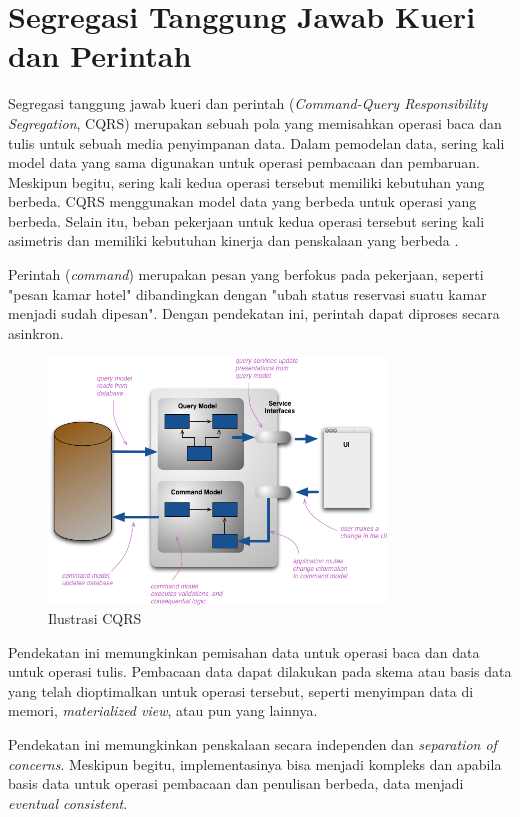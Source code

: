 \section{Segregasi Tanggung Jawab Kueri dan Perintah}

Segregasi tanggung jawab kueri dan perintah (\textit{Command-Query Responsibility Segregation}, CQRS) merupakan sebuah pola yang memisahkan operasi baca dan tulis untuk sebuah media penyimpanan data. Dalam pemodelan data, sering kali model data yang sama digunakan untuk operasi pembacaan dan pembaruan. Meskipun begitu, sering kali kedua operasi tersebut memiliki kebutuhan yang berbeda. CQRS menggunakan model data yang berbeda untuk operasi yang berbeda. Selain itu, beban pekerjaan untuk kedua operasi tersebut sering kali asimetris dan memiliki kebutuhan kinerja dan penskalaan yang berbeda \parencite{msCQRS}.

Perintah (\textit{command}) merupakan pesan yang berfokus pada pekerjaan, seperti "pesan kamar hotel" dibandingkan dengan "ubah status reservasi suatu kamar menjadi sudah dipesan". Dengan pendekatan ini, perintah dapat diproses secara asinkron.

\begin{figure}[htbp]
    \centering
    \includegraphics[width=0.8\textwidth]{resources/chapter-2/cqrs.png}
    \caption{Ilustrasi CQRS \parencite{fwCQRS}}
    \label{fig:cqrs-illustration}
\end{figure}

Pendekatan ini memungkinkan pemisahan data untuk operasi baca dan data untuk operasi tulis. Pembacaan data dapat dilakukan pada skema atau basis data yang telah dioptimalkan untuk operasi tersebut, seperti menyimpan data di memori, \textit{materialized view}, atau pun yang lainnya.

Pendekatan ini memungkinkan penskalaan secara independen dan \textit{separation of concerns}. Meskipun begitu, implementasinya bisa menjadi kompleks dan apabila basis data untuk operasi pembacaan dan penulisan berbeda, data menjadi \textit{eventual consistent}.
